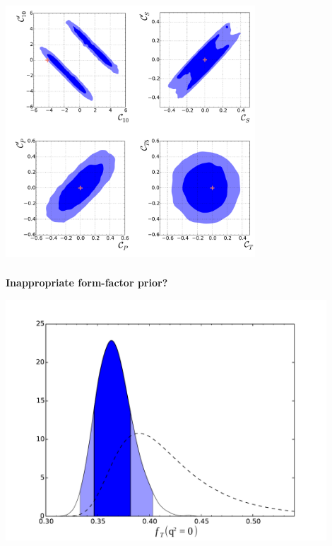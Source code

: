 \documentclass[english]{beamer}
\newcommand{\slide}[2][t]{\begin{frame}[#1] \frametitle{\insertsection} #2 \end{frame}}
\begin{document}
\slide{

    \frametitle{\insertsubsectionhead}

    \begin{center}
        \includegraphics[width=0.7\textwidth]{figures/Wilson_coeff_2d}
    \end{center}

}

\slide[t]{

    \frametitle{\insertsubsectionhead}

    {\large\textbf{Inappropriate form-factor prior?}}

    \begin{center}
        \includegraphics[width=0.9\textwidth]{figures/FF_ft0}
    \end{center}

}
\end{document}
